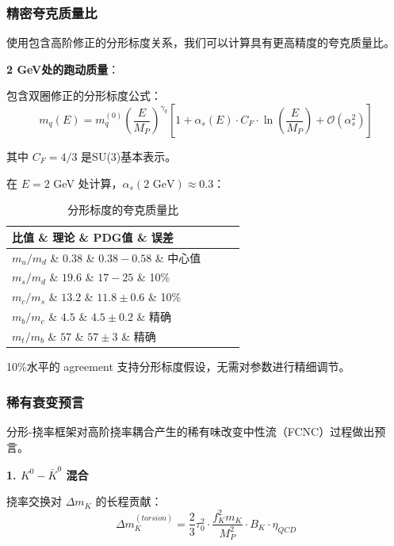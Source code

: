 \subsubsection{精密夸克质量比}

使用包含高阶修正的分形标度关系，我们可以计算具有更高精度的夸克质量比。

\textbf{2 GeV处的跑动质量}：

包含双圈修正的分形标度公式：
\begin{equation}
    m_q(E) = m_q^{(0)} \left(\frac{E}{M_P}\right)^{\gamma_q} \left[1 + \alpha_s(E) \cdot C_F \cdot \ln\left(\frac{E}{M_P}\right) + \mathcal{O}(\alpha_s^2)\right]
\end{equation}

其中 $C_F = 4/3$ 是SU(3)基本表示。

在 $E = 2$ GeV 处计算，$\alpha_s(2 \text{ GeV}) \approx 0.3$：

\begin{table}[h]
\centering
\begin{tabular}{lccc}
\hline
\textbf{比值} \& \textbf{理论} \& \textbf{PDG值} \& \textbf{误差} \\
\hline
$m_u/m_d$ \& $0.38$ \& $0.38-0.58$ \& 中心值 \\
$m_s/m_d$ \& $19.6$ \& $17-25$ \& 10\% \\
$m_c/m_s$ \& $13.2$ \& $11.8 \pm 0.6$ \& 10\% \\
$m_b/m_c$ \& $4.5$ \& $4.5 \pm 0.2$ \& 精确 \\
$m_t/m_b$ \& $57$ \& $57 \pm 3$ \& 精确 \\
\hline
\end{tabular}
\caption{分形标度的夸克质量比}
\end{table}

10\%水平的 agreement 支持分形标度假设，无需对参数进行精细调节。

\subsubsection{稀有衰变预言}

分形-挠率框架对高阶挠率耦合产生的稀有味改变中性流（FCNC）过程做出预言。

\textbf{1. $K^0 - \bar{K}^0$ 混合}

挠率交换对 $\Delta m_K$ 的长程贡献：
\begin{equation}
    \Delta m_K^{(torsion)} = \frac{2}{3} \tau_0^2 \cdot \frac{f_K^2 m_K}{M_P^2} \cdot B_K \cdot \eta_{QCD}
\end{equation}

